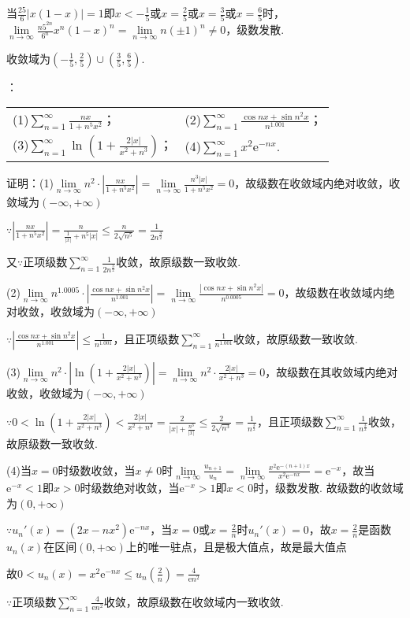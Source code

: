 \documentclass[12pt,UTF8]{ctexart}
\newcommand\Lim[0]{\lim\limits_{n\rightarrow\infty}}
\newcommand\Ser[1]{\sum_{n=#1}^\infty}
\begin{document}
\begin{enumerate}
当$\frac{25}6|x(1-x)|=1$即$x<-\frac15$或$x=\frac25$或$x=\frac35$或$x=\frac65$时，$\Lim\frac{n5^{2n}}{6^n}x^n(1-x)^n=\Lim n(\pm1)^n\neq0$，级数发散.

收敛域为$(-\frac15,\frac25)\cup(\frac35,\frac65)$.

：
\newline
\begin{tabular}{ll}
(1)$\Ser{1}\frac{nx}{1+n^5x^2}$；&(2)$\Ser{1}\frac{\cos nx+\sin n^2x}{n^{1.001}}$；\\
(3)$\Ser{1}\ln(1+\frac{2|x|}{x^2+n^3})$；&(4)$\Ser{1}x^2\mathrm e^{-nx}$.
\end{tabular}

证明：(1)$\Lim n^2\cdot|\frac{nx}{1+n^5x^2}|=\Lim\frac{n^3|x|}{1+n^5x^2}=0$，故级数在收敛域内绝对收敛，收敛域为$(-\infty,+\infty)$

$\because|\frac{nx}{1+n^5x^2}|=\frac n{\frac1{|x|}+n^5|x|}\leq\frac n{2\sqrt{n^5}}=\frac1{2n^{\frac32}}$

又$\because$正项级数$\Ser{1}\frac1{2n^{\frac32}}$收敛，故原级数一致收敛.

(2)$\Lim n^{1.0005}\cdot|\frac{\cos nx+\sin n^2x}{n^{1.001}}|=\Lim\frac{|\cos nx+\sin n^2x|}{n^{0.0005}}=0$，故级数在收敛域内绝对收敛，收敛域为$(-\infty,+\infty)$

$\because|\frac{\cos nx+\sin n^2x}{n^{1.001}}|\leq\frac1{n^{1.001}}$，且正项级数$\Ser{1}\frac1{n^{1.001}}$收敛，故原级数一致收敛.

(3)$\Lim n^2\cdot|\ln(1+\frac{2|x|}{x^2+n^3})|=\Lim n^2\cdot\frac{2|x|}{x^2+n^3}=0$，故级数在其收敛域内绝对收敛，收敛域为$(-\infty,+\infty)$

$\because0<\ln(1+\frac{2|x|}{x^2+n^3})<\frac{2|x|}{x^2+n^3}=\frac2{|x|+\frac{n^3}{|x|}}\leq\frac2{2\sqrt{n^3}}=\frac1{n^{\frac32}}$，且正项级数$\Ser{1}\frac1{n^{\frac32}}$收敛，故原级数一致收敛.

(4)当$x=0$时级数收敛，当$x\neq0$时$\Lim\frac{u_{n+1}}{u_n}=\Lim\frac{x^2\mathrm e^{-(n+1)x}}{x^2\mathrm e^{-nx}}=\mathrm e^{-x}$，故当$\mathrm e^{-x}<1$即$x>0$时级数绝对收敛，当$\mathrm e^{-x}>1$即$x<0$时，级数发散. 故级数的收敛域为$(0,+\infty)$

$\because u_n'(x)=(2x-nx^2)\mathrm e^{-nx}$，当$x=0$或$x=\frac2n$时$u_n'(x)=0$，故$x=\frac2n$是函数$u_n(x)$在区间$(0,+\infty)$上的唯一驻点，且是极大值点，故是最大值点

故$0<u_n(x)=x^2\mathrm e^{-nx}\leq u_n(\frac2n)=\frac4{\mathrm en^2}$

$\because$正项级数$\Ser{1}\frac4{\mathrm en^2}$收敛，故原级数在收敛域内一致收敛.


\end{enumerate}
\end{document}
